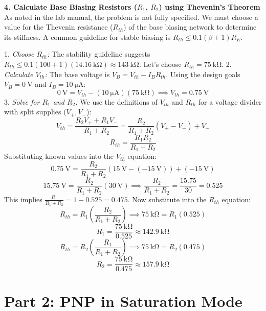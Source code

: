 \documentclass[11pt]{article}
\begin{document}
\textbf{4. Calculate Base Biasing Resistors ($R_1$, $R_2$) using Thevenin's Theorem} \\
As noted in the lab manual, the problem is not fully specified. We must choose a value for the Thevenin resistance ($R_{th}$) of the base biasing network to determine its stiffness. A common guideline for stable biasing is $R_{th} \le 0.1(\beta+1)R_E$.

1.  \textit{Choose $R_{th}$:} The stability guideline suggests $R_{th} \le 0.1(100+1)(\SI{14.16}{\kilo\ohm}) \approx \SI{143}{\kilo\ohm}$. Let's choose $R_{th} = \SI{75}{\kilo\ohm}$.
2.  \textit{Calculate $V_{th}$:} The base voltage is $V_B = V_{th} - I_B R_{th}$. Using the design goals $V_B = \SI{0}{\volt}$ and $I_B = \SI{10}{\micro\ampere}$:
    $$
    \SI{0}{\volt} = V_{th} - (\SI{10}{\micro\ampere})(\SI{75}{\kilo\ohm}) \implies V_{th} = \SI{0.75}{\volt}
    $$
3.  \textit{Solve for $R_1$ and $R_2$:} We use the definitions of $V_{th}$ and $R_{th}$ for a voltage divider with split supplies ($V_+, V_-$):
    $$ V_{th} = \frac{R_2 V_+ + R_1 V_-}{R_1 + R_2} = \frac{R_2}{R_1+R_2}(V_+ - V_-) + V_- $$
    $$ R_{th} = \frac{R_1 R_2}{R_1 + R_2} $$
    Substituting known values into the $V_{th}$ equation:
    $$ \SI{0.75}{\volt} = \frac{R_2}{R_1+R_2}(\SI{15}{\volt} - (\SI{-15}{\volt})) + (\SI{-15}{\volt}) $$
    $$ \SI{15.75}{\volt} = \frac{R_2}{R_1+R_2}(\SI{30}{\volt}) \implies \frac{R_2}{R_1+R_2} = \frac{15.75}{30} = 0.525 $$
    This implies $\frac{R_1}{R_1+R_2} = 1 - 0.525 = 0.475$.
    Now substitute into the $R_{th}$ equation:
    $$ R_{th} = R_1 \left(\frac{R_2}{R_1+R_2}\right) \implies \SI{75}{\kilo\ohm} = R_1 (0.525) $$
    $$ R_1 = \frac{\SI{75}{\kilo\ohm}}{0.525} \approx \SI{142.9}{\kilo\ohm} $$
    $$ R_{th} = R_2 \left(\frac{R_1}{R_1+R_2}\right) \implies \SI{75}{\kilo\ohm} = R_2 (0.475) $$
    $$ R_2 = \frac{\SI{75}{\kilo\ohm}}{0.475} \approx \SI{157.9}{\kilo\ohm} $$


\newpage
\section{Part 2: PNP in Saturation Mode}
\end{document}
